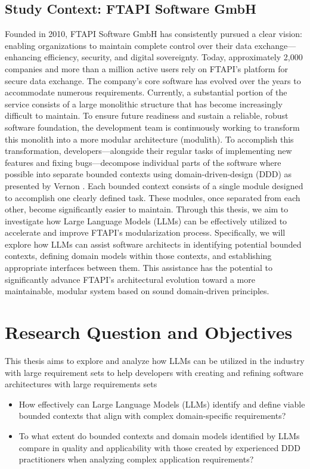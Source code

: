 \documentclass[12pt,a4paper]{article}
\begin{document}
\subsection{Study Context: FTAPI Software GmbH}
Founded in 2010, FTAPI Software GmbH has consistently pursued a clear vision: enabling organizations to maintain complete control over their data exchange—enhancing efficiency, security, and digital sovereignty. Today, approximately 2,000 companies and more than a million active users rely on FTAPI's platform for secure data exchange.
The company's core software has evolved over the years to accommodate numerous requirements. Currently, a substantial portion of the service consists of a large monolithic structure that has become increasingly difficult to maintain. To ensure future readiness and sustain a reliable, robust software foundation, the development team is continuously working to transform this monolith into a more modular architecture (modulith).
To accomplish this transformation, developers—alongside their regular tasks of implementing new features and fixing bugs—decompose individual parts of the software where possible into separate bounded contexts using domain-driven-design (DDD) as presented by Vernon \autocite[p.62]{vernon2013implementing}. Each bounded context consists of a single module designed to accomplish one clearly defined task. These modules, once separated from each other, become significantly easier to maintain.
Through this thesis, we aim to investigate how Large Language Models (LLMs) can be effectively utilized to accelerate and improve FTAPI's modularization process. Specifically, we will explore how LLMs can assist software architects in identifying potential bounded contexts, defining domain models within those contexts, and establishing appropriate interfaces between them. This assistance has the potential to significantly advance FTAPI's architectural evolution toward a more maintainable, modular system based on sound domain-driven principles.

\section{Research Question and Objectives}

This thesis aims to explore and analyze how LLMs can be utilized in the industry with large requirement sets to help developers with creating and refining software architectures with large requirements sets

\begin{itemize}
    \item How effectively can Large Language Models (LLMs) identify and define viable bounded contexts that align with complex domain-specific requirements?
    \item To what extent do bounded contexts and domain models identified by LLMs compare in quality and applicability with those created by experienced DDD practitioners when analyzing complex application requirements?
\end{itemize}
\end{document}
